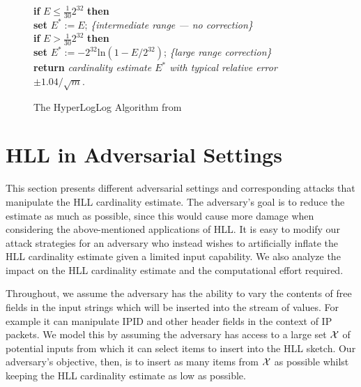 \documentclass{article}
\begin{document}
\begin{figure*}[tb!]
{{\begin{minipage}{40em}
\begin{flushleft}
\textbf{if} $E \le \frac{1}{30}2^{32}$ \textbf{then}\\
    \hspace{2em} \textbf{set} $E^*:= E$; \hfill \textit{\{intermediate range --- no correction\}}\\
\textbf{if} $E > \frac{1}{30}2^{32}$ \textbf{then}\\
    \hspace{2em}  \textbf{set} $E^*:= -2^{32}$ln$(1 - E/2^{32})$; \hfill \textit{\{large range correction\}}\\
\textbf{return} \textit{cardinality estimate $E^*$ with typical relative error} $\pm1.04/\sqrt{m}$.
\end{flushleft}
\end{minipage}
}}
\caption{The HyperLogLog Algorithm from~\cite{hll}}
\label{fig:hll}
\end{figure*}



\section{HLL in Adversarial Settings}\label{sec:attacks}

This section presents different adversarial settings and corresponding attacks that manipulate the HLL cardinality estimate. The adversary's goal is to reduce the estimate as much as possible, since this would cause more damage when  considering the above-mentioned applications of HLL. It is easy to modify our attack strategies for an adversary who instead wishes to artificially inflate the HLL cardinality estimate given a limited input capability. We also analyze the impact on the HLL cardinality estimate and the computational effort required.

Throughout, we assume the adversary has the ability to vary the contents of free fields in the input strings which will be inserted into the stream of values. For example it can manipulate IPID and other header fields in the context of IP packets. We model this by assuming the adversary has access to a large set ${\cal X}$ of potential inputs from which it can select items to insert into the HLL sketch. Our adversary's objective, then, is to insert as many items from ${\cal X}$ as possible whilst keeping the HLL cardinality estimate as low as possible.

\end{document}
